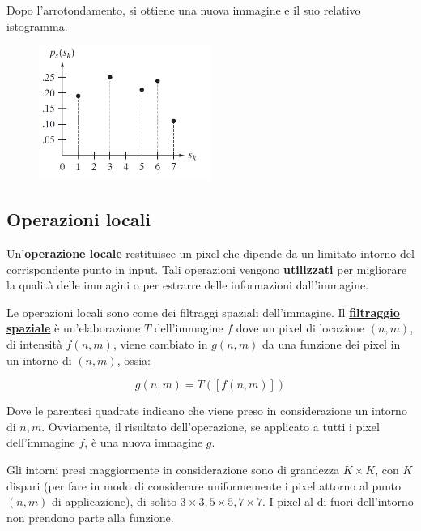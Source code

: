 \documentclass[a4paper]{article}
\begin{document}
	\newpage

	\noindent
	Dopo l'arrotondamento, si ottiene una nuova immagine e il suo relativo istogramma.
	
	\begin{figure}[!htp]
		\centering
		\includegraphics[width=0.5\textwidth]{img/eg_equalizzazione2.png}
	\end{figure}

	\newpage
	
	\subsection{Operazioni locali}
	
	Un'\textcolor{Red3}{\textbf{\underline{operazione locale}}} restituisce un pixel che dipende da un limitato intorno del corrispondente punto in input. Tali operazioni vengono \textbf{utilizzati} per migliorare la qualità delle immagini o per estrarre delle informazioni dall'immagine.\newline
	
	\noindent
	Le operazioni locali sono come dei filtraggi spaziali dell'immagine. Il \textbf{\underline{filtraggio spaziale}} è un'elaborazione $T$ dell'immagine $f$ dove un pixel di locazione $\left(n,m\right)$, di intensità $f\left(n,m\right)$, viene cambiato in $g\left(n,m\right)$ da una funzione dei pixel in un intorno di $\left(n,m\right)$, ossia:
	
	\begin{equation*}
		g\left(n,m\right) = T\left(\left[f\left(n,m\right)\right]\right)
	\end{equation*}

	\noindent
	Dove le parentesi quadrate indicano che viene preso in considerazione un intorno di $n,m$. Ovviamente, il risultato dell'operazione, se applicato a tutti i pixel dell'immagine $f$, è una nuova immagine $g$.\newline
	
	\noindent
	Gli intorni presi maggiormente in considerazione sono di grandezza $K \times K$, con $K$ dispari (per fare in modo di considerare uniformemente i pixel attorno al punto $\left(n,m\right)$ di applicazione), di solito $3 \times 3, 5 \times 5, 7 \times 7$. I pixel al di fuori dell'intorno non prendono parte alla funzione.\newline
	
\end{document}
